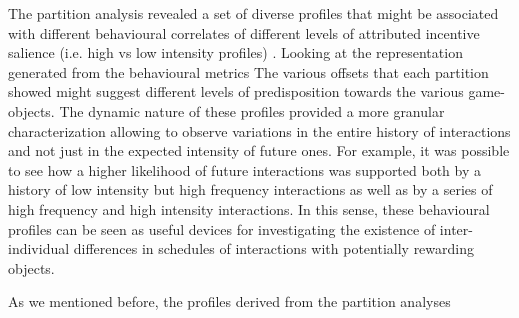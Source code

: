 The partition analysis revealed a set of diverse profiles that might be associated with different behavioural correlates of different levels of attributed incentive salience (i.e. high vs low intensity profiles) \cite{berridge2004motivation}. Looking at the representation generated from the behavioural metrics The various offsets that each partition showed might suggest different levels of predisposition towards the various game-objects. The dynamic nature of these profiles provided a more granular characterization allowing to observe variations in the entire history of interactions and not just in the expected intensity of future ones. For example, it was possible to see how a higher likelihood of future interactions was supported both by a history of low intensity but high frequency interactions as well as by a series of high frequency and high intensity interactions. In this sense, these behavioural profiles can be seen as useful devices for investigating the existence of inter-individual differences in schedules of interactions with potentially rewarding objects. 

As we mentioned before, the profiles derived from the partition analyses 